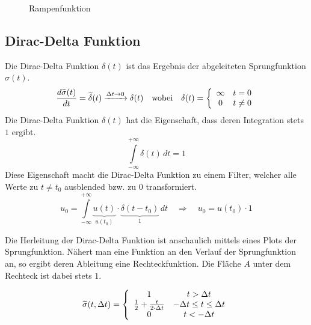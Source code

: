 \begin{figure}[h!]
	\centering
	\caption{Rampenfunktion}
	\label{fig:rampenfunktion}
\end{figure}

\subsection{Dirac-Delta Funktion}
Die Dirac-Delta Funktion $\delta(t)$ ist das Ergebnis der abgeleiteten
Sprungfunktion $\sigma(t)$.
\[  
	\frac{d \widetilde{\sigma}(t)}{dt} 
		= \widetilde{\delta}(t) 
		\xrightarrow{\Delta t \rightarrow 0}
		\delta(t) 
	\quad \text{wobei} \quad 
	\delta(t) = \left\{ 
		\begin{array}{c c}
			\infty & t=0 \\
			0 & t \neq 0
		\end{array}
		\right.
\]
Die Dirac-Delta Funktion $\delta(t)$ hat die Eigenschaft, dass deren 
Integration stets $1$ ergibt.
\[  
	\int\limits_{-\infty}^{+\infty} \delta(t)\,dt = 1
\]
Diese Eigenschaft macht die Dirac-Delta Funktion zu einem Filter, welcher
alle Werte zu $t \neq t_0$ ausblended bzw. zu $0$ transformiert.
\[  
	u_0 = \int\limits_{-\infty}^{+\infty} \underbrace{u(t)}_{u(t_0)} 
		\cdot \underbrace{\delta(t-t_0)}_{1}\,dt 
	\quad \Rightarrow \quad 
	u_0 = u(t_0) \cdot 1
\]

Die Herleitung der Dirac-Delta Funktion ist anschaulich mittels eines
Plots der Sprungfunktion. Nähert man eine Funktion an den Verlauf der
Sprungfunktion an, so ergibt deren Ableitung eine Rechteckfunktion.
Die Fläche $A$ unter dem Rechteck ist dabei stets $1$.

\[ 
	\widetilde{\sigma}(t, \Delta t) = \left\{
		\begin{array}{c c}
			1 & t > \Delta t \\
			\frac{1}{2} + \frac{t}{2 \cdot \Delta t} &
				- \Delta t \leq t \leq \Delta t \\
			0 & t < - \Delta t
		\end{array}
		\right.
\]

